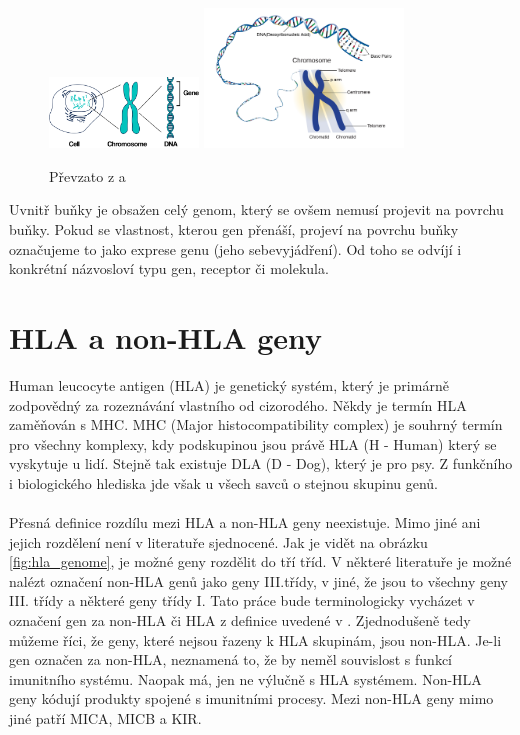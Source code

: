 \documentclass[czech,DP]{thesiskiv}
\numberwithin{equation}{section}
\begin{document}
\begin{figure}[H]		
		\centering
		\includegraphics[width=150px]{./img/lidska_bunka.png}
		\includegraphics[width=200px]{./img/chromosome.jpg}
		\caption{Převzato z \cite{human_cell} a \cite{chromosome_structure}}
		\label{fig:chrmosome}
\end{figure}

\noindent
Uvnitř buňky je obsažen celý genom, který se ovšem nemusí projevit na povrchu buňky. Pokud se vlastnost, kterou gen přenáší, projeví na povrchu buňky označujeme to jako exprese genu (jeho sebevyjádření). Od toho se odvíjí i konkrétní názvosloví typu gen, receptor či molekula.


\section{HLA a non-HLA geny}
Human leucocyte antigen (HLA) je genetický systém, který je primárně zodpovědný za rozeznávání vlastního od cizorodého. Někdy je termín HLA zaměňován s MHC. MHC (Major histocompatibility complex) je souhrný termín pro všechny komplexy, kdy podskupinou jsou právě HLA (H - Human) který se vyskytuje u lidí. Stejně tak existuje DLA (D - Dog), který je pro psy. Z funkčního i biologického hlediska jde však u všech savců o stejnou skupinu genů. \cite{KIR_transplantace_jindra}
\\
\\
Přesná definice rozdílu mezi HLA a non-HLA geny neexistuje. Mimo jiné ani jejich rozdělení není v literatuře sjednocené. Jak je vidět na obrázku \ref{fig:hla_genome}, je možné geny rozdělit do tří tříd. V některé literatuře je možné nalézt označení non-HLA genů jako geny III.třídy, v jiné, že jsou to všechny geny III. třídy a některé geny třídy I. Tato práce bude terminologicky vycházet v označení gen za non-HLA či HLA z definice uvedené v \cite{imgt_hla_database}. Zjednodušeně tedy můžeme říci, že geny, které nejsou řazeny k HLA skupinám, jsou non-HLA. Je-li gen označen za non-HLA, neznamená to, že by neměl souvislost s funkcí imunitního systému. Naopak má, jen ne výlučně s HLA systémem. Non-HLA geny kódují produkty spojené s imunitními procesy. Mezi non-HLA geny mimo jiné patří MICA, MICB a KIR. \cite{imgt_hla_database}
\end{document}
